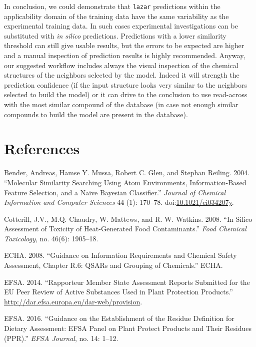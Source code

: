 \documentclass[]{achemso}
\begin{document}
In conclusion, we could demonstrate that \texttt{lazar} predictions
within the applicability domain of the training data have the same
variability as the experimental training data. In such cases
experimental investigations can be substituted with \emph{in silico}
predictions. Predictions with a lower similarity threshold can still
give usable results, but the errors to be expected are higher and a
manual inspection of prediction results is highly recommended. Anyway,
our suggested workflow includes always the visual inspection of the
chemical structures of the neighbors selected by the model. Indeed it
will strength the prediction confidence (if the input structure looks
very similar to the neighbors selected to build the model) or it can
drive to the conclusion to use read-across with the most similar
compound of the database (in case not enough similar compounds to build
the model are present in the database).

\section*{References}\label{references}

\hypertarget{refs}{}
\hypertarget{ref-doi:10.1021ux2fci034207y}{}
Bender, Andreas, Hamse Y. Mussa, Robert C. Glen, and Stephan Reiling.
2004. ``Molecular Similarity Searching Using Atom Environments,
Information-Based Feature Selection, and a Naïve Bayesian Classifier.''
\emph{Journal of Chemical Information and Computer Sciences} 44 (1):
170--78.
doi:\href{https://doi.org/10.1021/ci034207y}{10.1021/ci034207y}.

\hypertarget{ref-Cotterill2008}{}
Cotterill, J.V., M.Q. Chaudry, W. Mattews, and R. W. Watkins. 2008. ``In
Silico Assessment of Toxicity of Heat-Generated Food Contaminants.''
\emph{Food Chemical Toxicology}, no. 46(6): 1905--18.

\hypertarget{ref-ECHA2008}{}
ECHA. 2008. ``Guidance on Information Requirements and Chemical Safety
Assessment, Chapter R.6: QSARs and Grouping of Chemicals.'' ECHA.

\hypertarget{ref-EFSA2014}{}
EFSA. 2014. ``Rapporteur Member State Assessment Reports Submitted for
the EU Peer Review of Active Substances Used in Plant Protection
Products.'' \url{http://dar.efsa.europa.eu/dar-web/provision}.

\hypertarget{ref-EFSA2016}{}
EFSA. 2016. ``Guidance on the Establishment of the Residue Definition
for Dietary Assessment: EFSA Panel on Plant Protect Products and Their
Residues (PPR).'' \emph{EFSA Journal}, no. 14: 1--12.
\end{document}
